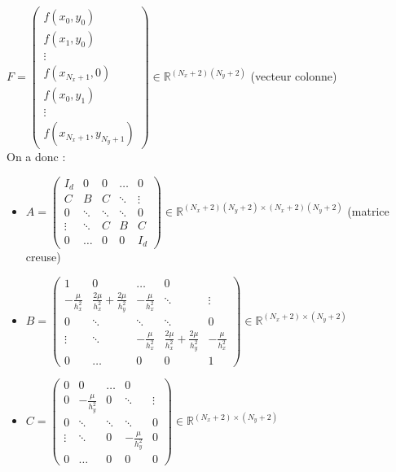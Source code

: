 \documentclass[12pt,a4paper]{article}
\begin{document}
\begin{enumerate}
    $F = \begin{pmatrix}
        f(x_0, y_0) \\
        f(x_1, y_0) \\
        \vdots \\
        f(x_{N_x+1}, 0) \\
        f(x_0, y_1) \\
        \vdots \\
        f(x_{N_x+1}, y_{N_y+1})
    \end{pmatrix} \in \mathbb{R}^{(N_x+2)(N_y+2)}$ (vecteur colonne)\\

    On a donc :
    \begin{itemize}
        \item $A = \begin{pmatrix}
            I_d & 0 & 0 & \dots & 0 \\
            C & B & C & \ddots & \vdots \\
            0 & \ddots & \ddots & \ddots & 0 \\
            \vdots & \ddots & C & B & C \\
            0 & \dots & 0 & 0 & I_d
        \end{pmatrix} \in \mathbb{R}^{(N_x+2)(N_y+2) \times (N_x+2)(N_y+2)}$ (matrice creuse)

        \item $B = \begin{pmatrix}
            1 & 0 & \dots & 0 \\
            -\frac{\mu}{h_x^2} & \frac{2\mu}{h_x^2} + \frac{2\mu}{h_y^2} & -\frac{\mu}{h_x^2} & \ddots & \vdots \\
            0 & \ddots & \ddots & \ddots & 0 \\
            \vdots & \ddots & -\frac{\mu}{h_x^2} & \frac{2\mu}{h_x^2} + \frac{2\mu}{h_y^2} & -\frac{\mu}{h_x^2} \\
            0 & \dots & 0 & 0 & 1
        \end{pmatrix} \in \mathbb{R}^{(N_x+2) \times (N_y+2)}$

        \item $C = \begin{pmatrix}
            0 & 0 & \dots & 0 \\
            0 & -\frac{\mu}{h_y^2} & 0 & \ddots & \vdots \\
            0 & \ddots & \ddots & \ddots & 0 \\
            \vdots & \ddots & 0 & -\frac{\mu}{h_y^2} & 0 \\
            0 & \dots & 0 & 0 & 0
        \end{pmatrix} \in \mathbb{R}^{(N_x+2) \times (N_y+2)}$

    \end{itemize}





\end{enumerate}
\end{document}
